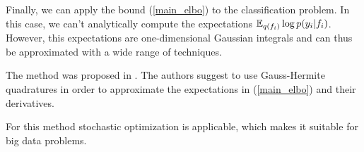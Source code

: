 Finally, we can apply the bound (\ref{main_elbo}) to the classification problem. In this case, we can't analytically compute the expectations $\mathbb{E}_{q(f_i)} \log p(y_i | f_i)$. However, this expectations are one-dimensional Gaussian integrals and can thus be approximated with a wide range of techniques. 

The method was proposed in \cite{SVIclassification}. The authors suggest to use Gauss-Hermite quadratures in order to approximate the expectations in (\ref{main_elbo}) and their derivatives. 

For this method stochastic optimization is applicable, which makes it suitable for big data problems.

